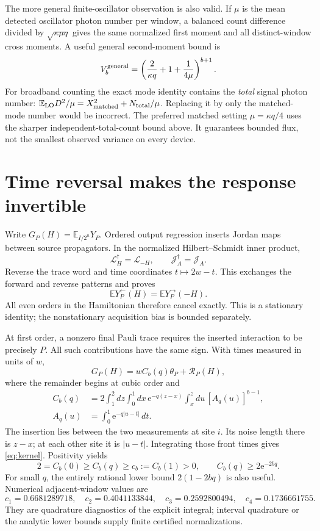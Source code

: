 \documentclass[11pt]{article}
\newcommand{\ee}{\mathrm e}
\newcommand{\cL}{\mathcal L}
\newcommand{\cJ}{\mathcal J}
\begin{document}
The more general finite-oscillator observation is also valid. If \(\mu\) is the mean detected oscillator photon number per window, a balanced count difference divided by \(\sqrt{\kappa\mu q}\) gives the same normalized first moment and all distinct-window cross moments. A useful general second-moment bound is
\[
 V_b^{\rm general}=
 \left(\frac2{\kappa q}+1+\frac1{4\mu}\right)^{b+1}.
\]
For broadband counting the exact mode identity contains the \emph{total} signal photon number: \(\mathbb E_{\rm LO}D^2/\mu=X_{\rm matched}^2+N_{\rm total}/\mu\). Replacing it by only the matched-mode number would be incorrect. The preferred matched setting \(\mu=\kappa q/4\) uses the sharper independent-total-count bound above. It guarantees bounded flux, not the smallest observed variance on every device.

\section{Time reversal makes the response invertible}
Write \(G_P(H)=\mathbb E_{I/2^n}Y_P\). Ordered output regression inserts Jordan maps between source propagators. In the normalized Hilbert--Schmidt inner product,
\[
 \cL_H^\dagger=\cL_{-H},\qquad \cJ_A^\dagger=\cJ_A.
\]
Reverse the trace word and time coordinates \(t\mapsto2w-t\). This exchanges the forward and reverse patterns and proves
\[
 \mathbb E Y_P^\leftarrow(H)=\mathbb E Y_P^\to(-H).
\]
All even orders in the Hamiltonian therefore cancel exactly. This is a stationary identity; the nonstationary acquisition bias is bounded separately.

At first order, a nonzero final Pauli trace requires the inserted interaction to be precisely \(P\). All such contributions have the same sign. With times measured in units of \(w\),
\begin{equation}
 G_P(H)=wC_b(q)\theta_P+\mathcal R_P(H),
 \label{eq:response}
\end{equation}
where the remainder begins at cubic order and
\begin{align}
 C_b(q)&=2\int_1^2\!dz\int_0^1\!dx\,
 \ee^{-q(z-x)}\int_x^z\!du\,[A_q(u)]^{b-1},\label{eq:kernel}\\
 A_q(u)&=\int_0^1\ee^{-q|u-t|}\,dt.\nonumber
\end{align}
The insertion lies between the two measurements at site \(i\). Its noise length there is \(z-x\); at each other site it is \(|u-t|\). Integrating those front times gives \eqref{eq:kernel}. Positivity yields
\[
 2=C_b(0)\ge C_b(q)\ge c_b:=C_b(1)>0,
 \qquad C_b(q)\ge2\ee^{-2bq}.
\]
For small \(q\), the entirely rational lower bound \(2(1-2bq)\) is also useful. Numerical adjacent-window values are
\[
 c_1=0.6681289718,\quad c_2=0.4041133844,\quad
 c_3=0.2592800494,\quad c_4=0.1736661755.
\]
They are quadrature diagnostics of the explicit integral; interval quadrature or the analytic lower bounds supply finite certified normalizations.
\end{document}
